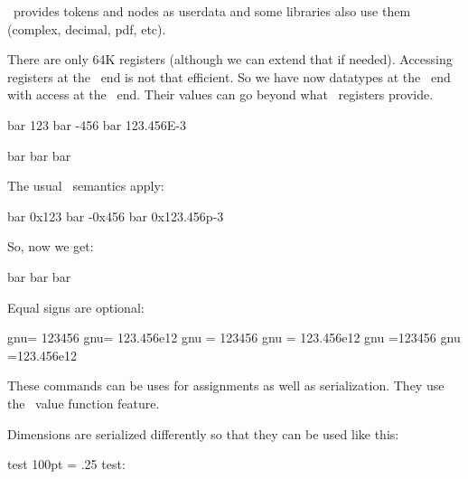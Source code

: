 \LUAMETATEX\ provides tokens and nodes as userdata and some libraries also
use them (complex, decimal, pdf, etc).

\stoptitle

\starttitle[title=Both worlds combined]

\startitemize[packed]
\startitem There are only 64K registers (although we can extend that if needed). \stopitem
\startitem Accessing registers at the \LUA\ end is not that efficient. \stopitem
\startitem So we have now datatypes at the \LUA\ end with access at the \TEX\ end. \stopitem
\startitem Their values can go beyond what \TEX\ registers provide. \stopitem
\stopitemize

\startbuffer
\luacardinal bar  123
\luainteger  bar -456
\luafloat    bar  123.456E-3
\stopbuffer

\typebuffer \getbuffer

\startbuffer
\the\luacardinal bar \quad
\the\luainteger  bar \quad
\the\luafloat    bar
\stopbuffer

\typebuffer \getbuffer

\page

The usual \LUA\ semantics apply:

\startbuffer
\luacardinal bar  0x123
\luainteger  bar -0x456
\luafloat    bar  0x123.456p-3
\stopbuffer

\typebuffer \getbuffer

So, now we get:

\startbuffer
\the\luacardinal bar \quad
\the\luainteger  bar \quad
\the\luafloat    bar
\stopbuffer

\getbuffer

Equal signs are optional:

\startbuffer
\luainteger gnu=  123456   \luafloat gnu=  123.456e12
\luainteger gnu = 123456   \luafloat gnu = 123.456e12
\luainteger gnu  =123456   \luafloat gnu  =123.456e12
\stopbuffer

\typebuffer

These commands can be uses for assignments as well as serialization. They use the
\LUAMETATEX\ value function feature.

\page

Dimensions are serialized differently so that they can be used like this:

\startbuffer
\luadimen test 100pt \scratchdimen = .25 \luadimen test: \the\scratchdimen
\stopbuffer

\typebuffer

\getbuffer

